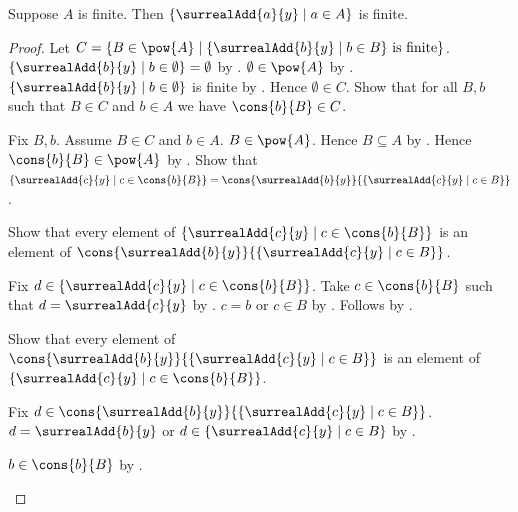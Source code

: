 \begin{lemma}\label{finite_surreal_add_image}
    Suppose $A$ is finite.
    Then $\{\surrealAdd{a}{y}\mid a\in A\}$ is finite.
\end{lemma}
\begin{proof}
    Let $C=\{B\in\pow{A}\mid
        \text{$\{\surrealAdd{b}{y}\mid b\in B\}$ is finite}\}$.
    $\{\surrealAdd{b}{y}\mid b\in\emptyset\}=\emptyset$
        by .
    $\emptyset\in\pow{A}$ by .
    $\{\surrealAdd{b}{y}\mid b\in\emptyset\}$ is finite
        by .
    Hence $\emptyset\in C$.
    Show that for all $B,b$ such that $B\in C$ and $b\in A$ we have
        $\cons{b}{B}\in C$.
    \begin{subproof}
        Fix $B,b$.
        Assume $B\in C$ and $b\in A$.
        $B\in\pow{A}$.
        Hence $B\subseteq A$ by .
        Hence $\cons{b}{B}\in\pow{A}$
            by .
        Show that $\{\surrealAdd{c}{y}\mid c\in\cons{b}{B}\}
            =\cons{\surrealAdd{b}{y}}
                {\{\surrealAdd{c}{y}\mid c\in B\}}$.
        \begin{subproof}
            Show that every element of
                $\{\surrealAdd{c}{y}\mid c\in\cons{b}{B}\}$
                is an element of
                $\cons{\surrealAdd{b}{y}}
                    {\{\surrealAdd{c}{y}\mid c\in B\}}$.
            \begin{subproof}
                Fix $d\in\{\surrealAdd{c}{y}\mid c\in\cons{b}{B}\}$.
                Take $c\in\cons{b}{B}$ such that
                    $d=\surrealAdd{c}{y}$
                    by .
                $c=b$ or $c\in B$ by .
                Follows by .
            \end{subproof}
            Show that every element of
                $\cons{\surrealAdd{b}{y}}
                    {\{\surrealAdd{c}{y}\mid c\in B\}}$
                is an element of
                $\{\surrealAdd{c}{y}\mid c\in\cons{b}{B}\}$.
            \begin{subproof}
                Fix $d\in\cons{\surrealAdd{b}{y}}
                    {\{\surrealAdd{c}{y}\mid c\in B\}}$.
                $d=\surrealAdd{b}{y}$ or
                    $d\in\{\surrealAdd{c}{y}\mid c\in B\}$
                    by .
                \begin{byCase}
                        $b\in\cons{b}{B}$ by .

\end{byCase}
\end{subproof}
\end{subproof}
\end{subproof}
\end{proof}

